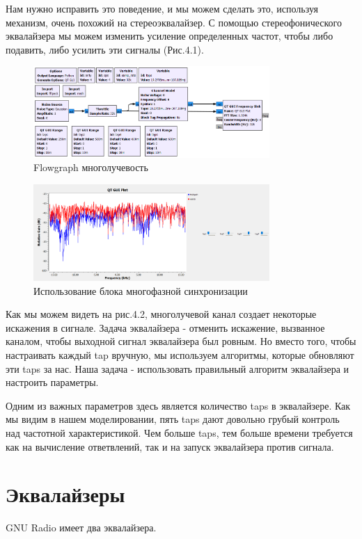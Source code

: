 \documentclass[a4paper,12pt]{report}
\begin{document}
    Нам нужно исправить это поведение, и мы можем сделать это, используя механизм, очень похожий на стереоэквалайзер. С помощью стереофонического эквалайзера мы можем изменить усиление определенных частот, чтобы либо подавить, либо усилить эти сигналы (Рис.4.1). 
\begin{figure}[H]
        \centering
        \includegraphics[width=0.8\textwidth]{fig4-1.PNG}
        \caption{Flowgraph многолучевость}
        \label{fig:fig4-1}
\end{figure}
\begin{figure}[H]
        \centering
        \includegraphics[width=0.8\textwidth]{fig4-2.PNG}
        \caption{Использование блока многофазной синхронизации}
        \label{fig:fig4-2}
\end{figure}    
    
    Как мы можем видеть на рис.4.2, многолучевой канал создает некоторые искажения в сигнале. Задача эквалайзера - отменить искажение, вызванное каналом, чтобы выходной сигнал эквалайзера был ровным. Но вместо того, чтобы настраивать каждый tap вручную, мы используем алгоритмы, которые обновляют эти taps за нас. Наша задача - использовать правильный алгоритм эквалайзера и настроить параметры. 
    
    Одним из важных параметров здесь является количество taps в эквалайзере. Как мы видим в нашем моделировании, пять taps дают довольно грубый контроль над частотной характеристикой. Чем больше taps, тем больше времени требуется как на вычисление ответвлений, так и на запуск эквалайзера против сигнала.
    
\chapter{Эквалайзеры}
    GNU Radio имеет два эквалайзера.
\end{document}
